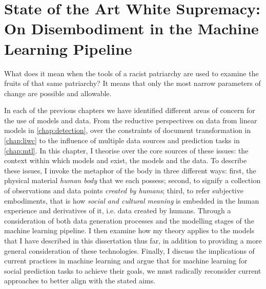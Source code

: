 \ifpdf
    \graphicspath{{Chapter6/Figs/Raster/}{Chapter6/Figs/PDF/}{Chapter6/Figs/}}
\else
    \graphicspath{{Chapter6/Figs/Vector/}{Chapter6/Figs/}}
\fi


\chapter[State of the Art White Supremacy: On Disembodiment in the Machine Learning Pipeline]{State of the Art White Supremacy: On Disembodiment in the Machine Learning Pipeline\footnotemark{}}\label{chap:disembodied}

\begin{citequote}{\citet[p.110-111]{Lorde:1984}}
What does it mean when the tools of a racist patriarchy are used to examine the fruits of that same patriarchy?  It means that only the most narrow parameters of change are possible and allowable.
\end{citequote}

In each of the previous chapters we have identified different areas of concern for the use of models and data. From the reductive perspectives on data from linear models in \autoref{chap:detection}, over the constraints of document transformation in \autoref{chap:liwc} to the influence of multiple data sources and prediction tasks in \autoref{chap:mtl}. In this chapter, I theorise over the core sources of these issues: the context within which models and exist, the models and the data.
To describe these issues, I invoke the metaphor of the body in three different ways: first, the physical material \textit{human body} that we each possess; second, to signify a collection of observations and data points \textit{created by humans}; third, to refer subjective embodiments, that is how \textit{social and cultural meaning} is embedded in the human experience and derivatives of it, i.e. data created by humans.
 Through a consideration of both data generation processes and the modelling stages of the machine learning pipeline. I then examine how my theory applies to the models that I have described in this dissertation thus far, in addition to providing a more general consideration of these technologies. Finally, I discuss the implications of current practices in machine learning and argue that for machine learning for social prediction tasks to achieve their goals, we must radically reconsider current approaches to better align with the stated aims.


